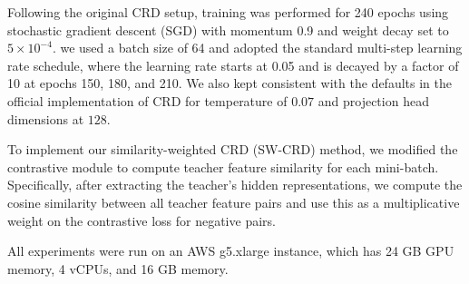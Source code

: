 \documentclass{article}
\theoremstyle{plain}
\theoremstyle{remark}
\begin{document}
Following the original CRD setup, training was performed for 240 epochs using stochastic gradient descent (SGD) with momentum 0.9 and weight decay set to $5\times10^{-4}$. we used a batch size of 64 and adopted the standard multi-step learning rate schedule, where the learning rate starts at 0.05 and is decayed by a factor of 10 at epochs 150, 180, and 210. We also kept consistent with the defaults in the official implementation of CRD for temperature of $0.07$ and projection head dimensions at $128$.

To implement our similarity-weighted CRD (SW-CRD) method, we modified the contrastive module to compute teacher feature similarity for each mini-batch. Specifically, after extracting the teacher’s hidden representations, we compute the cosine similarity between all teacher feature pairs and use this as a multiplicative weight on the contrastive loss for negative pairs. 

All experiments were run on an AWS g5.xlarge instance, which has 24 GB GPU memory, 4 vCPUs, and 16 GB memory. \label{device}
\end{document}
